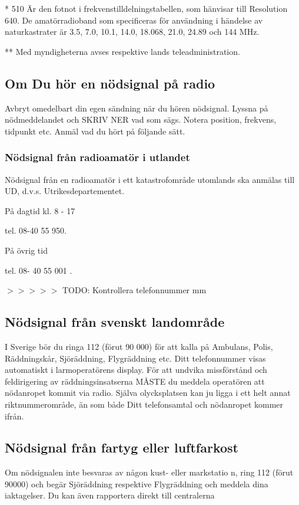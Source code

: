 * 510 Är den fotnot i frekvenstilldelningstabellen, som hänvisar till
Resolution 640. De amatörradioband som specificeras för användning i
händelse av naturkastrater är 3.5, 7.0, 10.1, 14.0, 18.068, 21.0,
24.89 och 144 MHz.

** Med myndigheterna avses respektive lands teleadministration.

\subsection{Om Du hör en nödsignal på radio}

Avbryt omedelbart din egen sändning när du hören nödsignal. Lyssna på
nödmeddelandet och SKRIV NER vad som sägs. Notera position, frekvens, tidpunkt
etc. Anmäl vad du hört på följande sätt.

\subsubsection{Nödsignal från radioamatör i utlandet}

Nödsignal från en radioamatör i ett katastrofområde utomlands ska anmälas till UD, d.v.s.
Utrikesdepartementet.

På dagtid kl. 8 - 17

tel. 08-40 55 950.

På övrig tid

tel. 08- 40 55 001 .

$>>>>>$ TODO: Kontrollera telefonnummer mm

\subsection{Nödsignal från svenskt landområde}

I Sverige bör du ringa 112 (förut 90 000) för att kalla på Ambulans, Polis,
Räddningskår, Sjöräddning, Flygräddning etc. Ditt telefonnummer visas
automatiskt i larmoperatörens display.  För att undvika missförstånd och
feldirigering av räddningsinsatserna MÅSTE du meddela operatören att nödanropet
kommit via radio. Själva olycksplatsen kan ju ligga i ett helt annat
riktnummerområde, än som både Ditt telefonsamtal och nödanropet kommer ifrån.

\subsection{Nödsignal från fartyg eller luftfarkost}

Om nödsignalen inte besvaras av någon kust- eller markstatio n, ring 112
(förut 90000) och begär Sjöräddning respektive Flygräddning och meddela dina
iaktagelser. Du kan även rapportera direkt till centralerna

